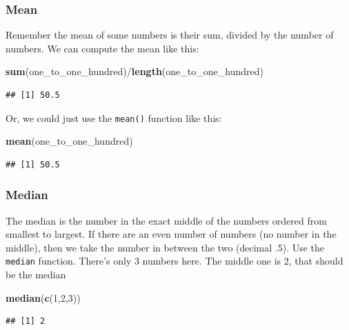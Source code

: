 \documentclass[]{book}
\newenvironment{Shaded}{\begin{snugshade}}{\end{snugshade}}
\newcommand{\KeywordTok}[1]{\textcolor[rgb]{0.13,0.29,0.53}{\textbf{{#1}}}}
\newcommand{\DecValTok}[1]{\textcolor[rgb]{0.00,0.00,0.81}{{#1}}}
\newcommand{\NormalTok}[1]{{#1}}
\theoremstyle{definition}
\theoremstyle{definition}
\theoremstyle{definition}
\theoremstyle{remark}
\begin{document}
\subsubsection{Mean}\label{mean}

Remember the mean of some numbers is their sum, divided by the number of
numbers. We can compute the mean like this:

\begin{Shaded}
\begin{Highlighting}[]
\KeywordTok{sum}\NormalTok{(one_to_one_hundred)/}\KeywordTok{length}\NormalTok{(one_to_one_hundred)}
\end{Highlighting}
\end{Shaded}

\begin{verbatim}
## [1] 50.5
\end{verbatim}

Or, we could just use the \texttt{mean()} function like this:

\begin{Shaded}
\begin{Highlighting}[]
\KeywordTok{mean}\NormalTok{(one_to_one_hundred)}
\end{Highlighting}
\end{Shaded}

\begin{verbatim}
## [1] 50.5
\end{verbatim}

\subsubsection{Median}\label{median}

The median is the number in the exact middle of the numbers ordered from
smallest to largest. If there are an even number of numbers (no number
in the middle), then we take the number in between the two (decimal .5).
Use the \texttt{median} function. There's only 3 numbers here. The
middle one is 2, that should be the median

\begin{Shaded}
\begin{Highlighting}[]
\KeywordTok{median}\NormalTok{(}\KeywordTok{c}\NormalTok{(}\DecValTok{1}\NormalTok{,}\DecValTok{2}\NormalTok{,}\DecValTok{3}\NormalTok{))}
\end{Highlighting}
\end{Shaded}

\begin{verbatim}
## [1] 2
\end{verbatim}
\end{document}
